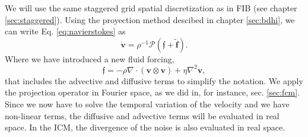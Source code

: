 \documentclass[ twoside,openright,titlepage,numbers=noenddot,%
headinclude,footinclude,cleardoublepage=empty,abstract=on,
BCOR=5mm,paper=b5,fontsize=11pt, dvipsnames
]{scrreprt}
\renewcommand{\vec}[1]{\bm{#1}}
\newcommand{\oper}[1]{\mathcal{#1}}
\newcommand{\fvel}{v}
\begin{document}
We will use the same staggered grid spatial discretization as in \gls{FIB} (see chapter \ref{sec:staggered}).
Using the proyection method descibed in chapter \ref{sec:bdhi}, we can write Eq. \eqref{eq:navierstokes} as
\begin{equation}
  \dot{\vec{\fvel}} = \rho^{-1} \oper{P}\left(\vec{\mathfrak{f}} + \tilde{\vec{f}}\right).
\end{equation}
Where we have introduced a new fluid forcing,
\begin{equation}
  \vec{\mathfrak{f}} = -\rho\nabla\cdot (\vec{\fvel}\otimes\vec{\fvel}) + \eta\nabla^2\vec{\fvel},
\end{equation}
that includes the advective and diffusive terms to simplify the notation.
We apply the projection operator in Fourier space, as we did in, for instance, sec. \ref{sec:fcm}. Since we now have to solve the temporal variation of the velocity and we have non-linear terms, the diffusive and advective terms will be evaluated in real space. In the \gls{ICM}, the divergence of the noise is also evaluated in real space.
\end{document}
